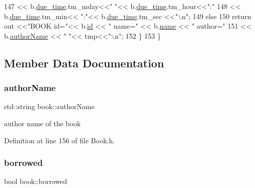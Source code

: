 \begin{DoxyCode}
147                      << b.\hyperlink{classbook_abf72d9a32cdadee632df5a626dbe33b8}{due\_time}.tm\_mday<<\textcolor{stringliteral}{" "}<< b.\hyperlink{classbook_abf72d9a32cdadee632df5a626dbe33b8}{due\_time}.tm\_hour<<\textcolor{stringliteral}{":"}
148                      << b.\hyperlink{classbook_abf72d9a32cdadee632df5a626dbe33b8}{due\_time}.tm\_min<< \textcolor{stringliteral}{":"}<< b.\hyperlink{classbook_abf72d9a32cdadee632df5a626dbe33b8}{due\_time}.tm\_sec <<\textcolor{stringliteral}{"\(\backslash\)n"};
149          \textcolor{keywordflow}{else}
150              \textcolor{keywordflow}{return} out <<\textcolor{stringliteral}{"BOOK id="}<< b.\hyperlink{classbook_ad8bf54b50c72af3827823c04d724d824}{id} << \textcolor{stringliteral}{" name="} << b.\hyperlink{classbook_a5eabc1c1c5abff26997bec3d41f90d9e}{name} << \textcolor{stringliteral}{" author="}
151                                  << b.\hyperlink{classbook_a21b2962c6227818732db27f12121b732}{authorName} << \textcolor{stringliteral}{" "}<< tmp<<\textcolor{stringliteral}{"\(\backslash\)n"};
152      \}
153 \}
\end{DoxyCode}


\subsection{Member Data Documentation}
\mbox{\label{classbook_a21b2962c6227818732db27f12121b732}} 
\subsubsection{\texorpdfstring{author\+Name}{authorName}}
{\footnotesize\ttfamily std\+::string book\+::author\+Name\hspace{0.3cm}{\ttfamily [private]}}

author name of the book 

Definition at line 156 of file Book.\+h.

\mbox{\label{classbook_ab745520ed537e69bde6f2e3d7a103276}} 
\subsubsection{\texorpdfstring{borrowed}{borrowed}}
{\footnotesize\ttfamily bool book\+::borrowed\hspace{0.3cm}{\ttfamily [private]}}

